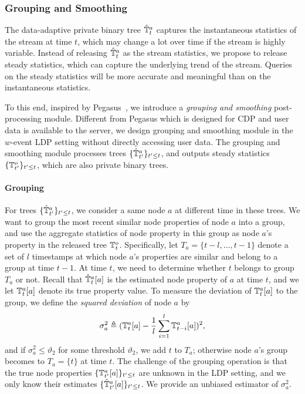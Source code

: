 \subsubsection{Grouping and Smoothing}
\label{ss:group_and_smooth}
The data-adaptive private binary tree $\hat{\mathbb{T}}^a_t$ captures the instantaneous
statistics of the stream at time $t$, which may change a lot over time if the
stream is highly variable.
Instead of releasing $\hat{\mathbb{T}}^a_t$ as the stream statistics, we propose to release
steady statistics, which can capture the underlying trend of the stream.
Queries on the steady statistics will be more accurate and meaningful than on
the instantaneous statistics.

To this end, inspired by Pegasus~\cite{Chen2017}, we introduce a \emph{grouping
  and smoothing} post-processing module.
Different from Pegasus which is designed for CDP and user data is available to
the server, we design grouping and smoothing module in the $w$-event LDP setting
without directly accessing user data.
The grouping and smoothing module processes trees $\{\hat{\mathbb{T}}^a_{t'}\}_{t'\leq t}$,
and outputs steady statistics $\{\mathbb{T}^o_{t'}\}_{t'\leq t}$, which are also private
binary trees.

\paragraph{Grouping}
For trees $\{\hat{\mathbb{T}}^a_{t'}\}_{t'\leq t}$, we consider a same node $a$ at different
time in these trees.
We want to group the most recent similar node properties of node $a$ into a
group, and use the aggregate statistics of node property in this group as node
$a$'s property in the released tree $\mathbb{T}^o_t$.
Specifically, let $T_a=\{t-l,\ldots,t-1\}$ denote a set of $l$ timestamps at
which node $a$'s properties are similar and belong to a group at time $t-1$.
At time $t$, we need to determine whether $t$ belongs to group $T_a$ or not.
Recall that $\hat{\mathbb{T}}^a_t[a]$ is the estimated node property of $a$ at time $t$, and
we let $\mathbb{T}^a_t[a]$ denote its true property value.
To measure the deviation of $\mathbb{T}^a_t[a]$ to the group, we define the \emph{squared
  deviation} of node $a$ by
\[
  \sigma_a^2\triangleq (\mathbb{T}^a_t[a] - \frac{1}{l}\sum_{i=1}^l\mathbb{T}^a_{t-i}[a])^2,
\]
and if $\sigma_a^2\leq\vartheta_2$ for some threshold $\vartheta_2$, we add $t$ to
$T_a$; otherwise node $a$'s group becomes to $T_a=\{t\}$ at time $t$.
The challenge of the grouping operation is that the true node properties
$\{\mathbb{T}^a_{t'}[a]\}_{t'\leq t}$ are unknown in the LDP setting, and we only know
their estimates $\{\hat{\mathbb{T}}^a_{t'}[a]\}_{t'\leq t}$.
We provide an unbiased estimator of $\sigma_a^2$.

